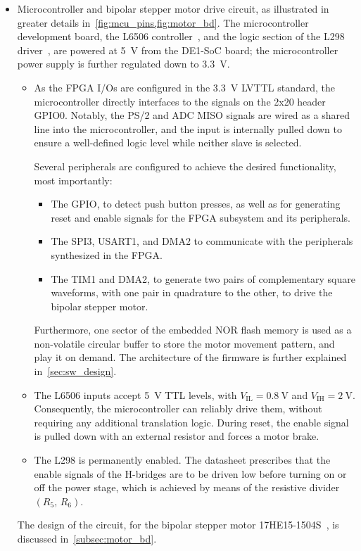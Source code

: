 \begin{itemize}
    \item Microcontroller and bipolar stepper motor drive circuit, as illustrated in greater details in~\cref{fig:mcu_pins,fig:motor_bd}.
    The microcontroller development board, the L6506 controller~\cite{l6506}, and the logic section of the L298 driver~\cite{l298}, are powered at \qty{5}{\V} from the DE1-SoC board; the microcontroller power supply is further regulated down to \qty{3.3}{\V}.
    \begin{itemize}
        \item As the FPGA I/Os are configured in the \qty{3.3}{\V} LVTTL standard, the microcontroller directly interfaces to the signals on the 2x20 header GPIO0. Notably, the PS/2 and ADC MISO signals are wired as a shared line into the microcontroller, and the input is internally pulled down to ensure a well-defined logic level while neither slave is selected.

        Several peripherals are configured to achieve the desired functionality, most importantly:
        \begin{itemize}
            \item The GPIO, to detect push button presses, as well as for generating reset and enable signals for the FPGA subsystem and its peripherals.
            \item The SPI3, USART1, and DMA2 to communicate with the peripherals synthesized in the FPGA.
            \item The TIM1 and DMA2, to generate two pairs of complementary square waveforms, with one pair in quadrature to the other, to drive the bipolar stepper motor.
        \end{itemize}
        Furthermore, one sector of the embedded NOR flash memory is used as a non-volatile circular buffer to store the motor movement pattern, and play it on demand. The architecture of the firmware is further explained in~\cref{sec:sw_design}.
        
        \item The L6506 inputs accept \qty{5}{\V} TTL levels, with $V_\text{IL} = \qty{0.8}{\V}$ and $V_\text{IH} = \qty{2}{\V}$. Consequently, the microcontroller can reliably drive them, without requiring any additional translation logic. During reset, the enable signal is pulled down with an external resistor and forces a motor brake.

        \item The L298 is permanently enabled. The datasheet prescribes that the enable signals of the H-bridges are to be driven low before turning on or off the power stage, which is achieved by means of the resistive divider $(R_5,\,R_6)$. 
    \end{itemize}
    The design of the circuit, for the bipolar stepper motor 17HE15-1504S~\cite{stepp}, is discussed in~\cref{subsec:motor_bd}.
\end{itemize}

